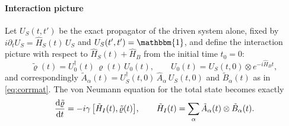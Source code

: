 \documentclass[a4paper,11pt]{article}
\newcommand{\id}{\mathbbm{1}}
\begin{document}
\paragraph{Interaction picture}
Let $U_S(t,t')$ be the exact propagator of the driven system alone, fixed by $i\partial_t U_S = \hat H_S(t)\,U_S$ and $U_S(t',t') = \id$, and define the interaction picture with respect to $\hat H_S(t) + \hat H_B$ from the initial time $t_0 = 0$:
\begin{equation}
  \tilde\varrho(t) = U_0^\dagger(t)\,\varrho(t)\,U_0(t),
  \qquad
  U_0(t) = U_S(t,0)\otimes e^{-i\hat H_B t},
\end{equation}
and correspondingly $\tilde A_\alpha(t) = U_S^\dagger(t,0)\,\hat A_\alpha\,U_S(t,0)$ and $\tilde B_\alpha(t)$ as in \cref{eq:corrmat}. The von Neumann equation for the total state becomes exactly
\begin{equation}\label{eq:vonneumann}
  \dv{\tilde\varrho}{t} = -i\gamma\,\comm{\tilde H_I(t)}{\tilde\varrho(t)},
  \qquad
  \tilde H_I(t) = \sum_\alpha \tilde A_\alpha(t)\otimes\tilde B_\alpha(t).
\end{equation}
\end{document}
